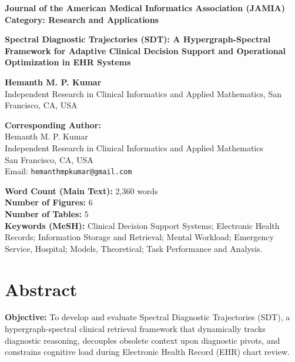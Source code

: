 \documentclass[12pt]{article}
\begin{document}
\begin{titlepage}
\noindent
\textbf{\large Journal of the American Medical Informatics Association (JAMIA)}\\
\textbf{Category: Research and Applications}
\vspace{1.5cm}

\begin{center}
  {\Large \textbf{Spectral Diagnostic Trajectories (SDT): A Hypergraph-Spectral Framework for Adaptive Clinical Decision Support and Operational Optimization in EHR Systems}}
  \vspace{1.5cm}

  \textbf{Hemanth M. P. Kumar}\\[6pt]
  {\small Independent Research in Clinical Informatics and Applied Mathematics, San Francisco, CA, USA}
  \vspace{1.5cm}

  \textbf{Corresponding Author:}\\
  Hemanth M. P. Kumar\\
  Independent Research in Clinical Informatics and Applied Mathematics\\
  San Francisco, CA, USA\\
  Email: \texttt{hemanthmpkumar@gmail.com}
  \vspace{1.5cm}

  \textbf{Word Count (Main Text):} 2{,}360 words\\
  \textbf{Number of Figures:} 6\\
  \textbf{Number of Tables:} 5\\
  \textbf{Keywords (MeSH):} Clinical Decision Support Systems; Electronic Health Records; Information Storage and Retrieval; Mental Workload; Emergency Service, Hospital; Models, Theoretical; Task Performance and Analysis.
\end{center}
\end{titlepage}

\newpage

\section*{Abstract}
\noindent
\textbf{Objective:} To develop and evaluate Spectral Diagnostic Trajectories (SDT), a hypergraph-spectral clinical retrieval framework that dynamically tracks diagnostic reasoning, decouples obsolete context upon diagnostic pivots, and constrains cognitive load during Electronic Health Record (EHR) chart review.
\end{document}
